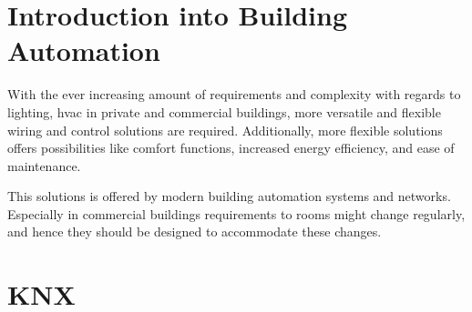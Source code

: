 
\section{Introduction into Building Automation}
\label{sec:background:bas:intro}

With the ever increasing amount of requirements and complexity with regards to lighting, \gls{hvac} in private and commercial buildings, more versatile and flexible wiring and control solutions are required. 
Additionally, more flexible solutions offers possibilities like comfort functions, increased energy efficiency, and ease of maintenance. \parencite{Merz2009}

This solutions is offered by modern building automation systems and networks. Especially in commercial buildings requirements to rooms might change regularly, and hence they should be designed to accommodate these changes. \parencite{Merz2009}


\section{KNX}
\label{sec:background:bas:knx}

